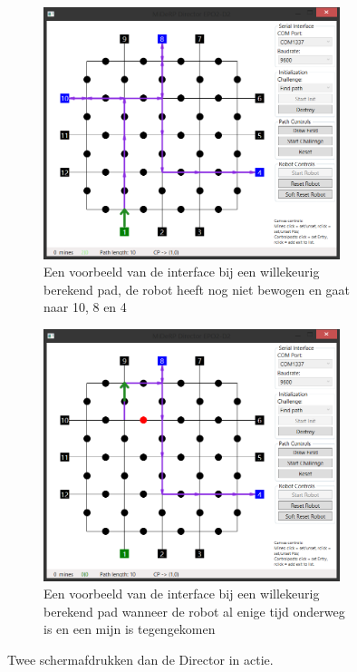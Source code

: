 \documentclass{report}
\begin{document}
\begin{figure}[H]
	\centering
	\begin{subfigure}{0.48\textwidth}
		\centering
		\includegraphics[width=0.95\textwidth]{resource/director-initial-screenshot}
		\caption{Een voorbeeld van de interface bij een willekeurig berekend pad, de robot heeft nog niet bewogen en gaat naar 10, 8 en 4}
		\label{fig:director-initial}
	\end{subfigure}
	\begin{subfigure}{0.48\textwidth}
		\includegraphics[width=0.95\textwidth]{resource/director-ontheway-screenshot}
		\caption{Een voorbeeld van de interface bij een willekeurig berekend pad wanneer de robot al enige tijd onderweg is en een mijn is tegengekomen}
		\label{fig:director-ontheway}
	\end{subfigure}
	\caption{Twee schermafdrukken dan de Director in actie.}
	\label{fig:director}
\end{figure}
\end{document}
